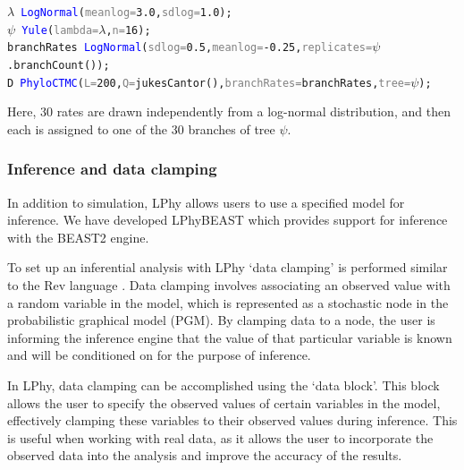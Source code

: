 \documentclass[10pt,letterpaper,table]{article}
\theoremstyle{definition}
\begin{document}
{
\small
\begin{alltt}
  \textcolor{bluishgreen}{\(\lambda\)} ~ \textcolor{blue}{LogNormal}(\textcolor{gray}{meanlog=}\textcolor{constant}{3.0}, \textcolor{gray}{sdlog=}\textcolor{constant}{1.0});
  \textcolor{bluishgreen}{\(\psi\)} ~ \textcolor{blue}{Yule}(\textcolor{gray}{lambda=}\textcolor{bluishgreen}{\(\lambda\)}, \textcolor{gray}{n=}\textcolor{constant}{16});
  \textcolor{bluishgreen}{branchRates} ~ \textcolor{blue}{LogNormal}(\textcolor{gray}{sdlog=}\textcolor{constant}{0.5}, \textcolor{gray}{meanlog=}\textcolor{constant}{-0.25}, \textcolor{gray}{replicates=}\textcolor{bluishgreen}{\(\psi\)}.\textcolor{generator}{branchCount}());
  \textcolor{bluishgreen}{D} ~ \textcolor{blue}{PhyloCTMC}(\textcolor{gray}{L=}\textcolor{constant}{200}, \textcolor{gray}{Q=}\textcolor{generator}{jukesCantor}(), \textcolor{gray}{branchRates=}\textcolor{bluishgreen}{branchRates}, \textcolor{gray}{tree=}\textcolor{bluishgreen}{\(\psi\)});
\end{alltt}
}

Here, 30 rates are drawn independently from a log-normal distribution, and then each is assigned to one of the 30 branches of tree $\psi$.

\subsubsection{Inference and data clamping}
\label{sec:dataclamping}
In addition to simulation, LPhy allows users to use a specified model for inference. 
We have developed LPhyBEAST which provides support for inference with the BEAST2 engine. 

To set up an inferential analysis with LPhy `data clamping' is performed similar to the Rev language \cite{revbayes}.
Data clamping involves associating an observed value with a random variable in the model, which is represented as a stochastic node in the probabilistic graphical model (PGM). 
By clamping data to a node, the user is informing the inference engine that the value of that particular variable is known and will be conditioned on for the purpose of inference.

In LPhy, data clamping can be accomplished using the `data block'. 
This block allows the user to specify the observed values of certain variables in the model, effectively clamping these variables to their observed values during inference. 
This is useful when working with real data, as it allows the user to incorporate the observed data into the analysis and improve the accuracy of the results.
\end{document}
